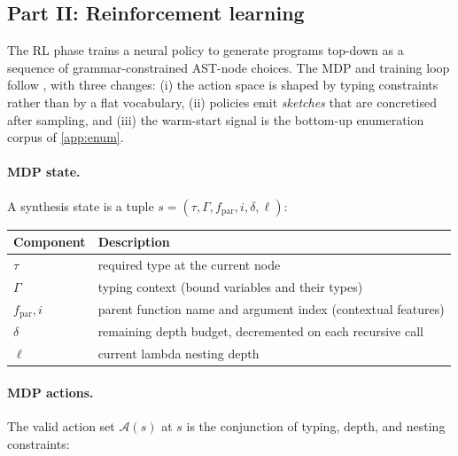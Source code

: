 \documentclass[12pt]{article}
\begin{document}
\subsection{Part II: Reinforcement learning}\label{app:rl}

The RL phase trains a neural policy to generate programs top-down as a sequence of grammar-constrained AST-node choices. The MDP and training loop follow \citet{abolafia2018priority}, with three changes: (i) the action space is shaped by typing constraints rather than by a flat vocabulary, (ii) policies emit \emph{sketches} that are concretised after sampling, and (iii) the warm-start signal is the bottom-up enumeration corpus of \cref{app:enum}.

\paragraph{MDP state.} A synthesis state is a tuple $s = (\tau, \Gamma, f_{\text{par}}, i, \delta, \ell)$:

\begin{center}
\small
\begin{tabular}{ll}
\toprule
Component & Description \\
\midrule
$\tau$               & required type at the current node \\
$\Gamma$             & typing context (bound variables and their types) \\
$f_{\text{par}}, i$  & parent function name and argument index (contextual features) \\
$\delta$             & remaining depth budget, decremented on each recursive call \\
$\ell$               & current lambda nesting depth \\
\bottomrule
\end{tabular}
\end{center}

\paragraph{MDP actions.} The valid action set $\mathcal{A}(s)$ at $s$ is the conjunction of typing, depth, and nesting constraints:
\end{document}
